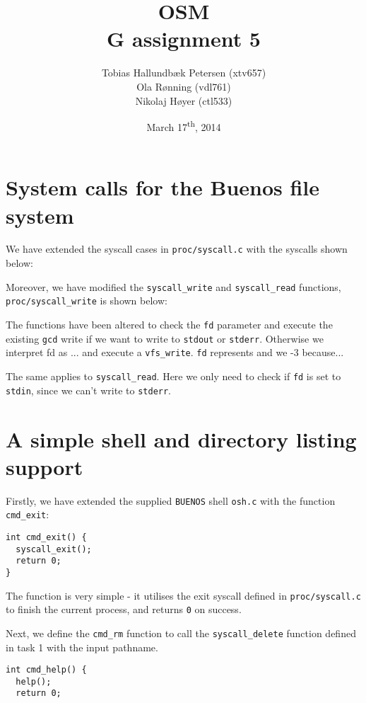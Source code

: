\documentclass[a4paper,12pt]{article}
\title{OSM\\G assignment 5}
\author{Tobias Hallundbæk Petersen (xtv657)\\Ola Rønning (vdl761)\\Nikolaj Høyer (ctl533)}
\date{March 17\textsuperscript{th}, 2014}
\begin{document}
\maketitle
\tableofcontents
\newpage

\section{System calls for the Buenos file system}
We have extended the syscall cases in \texttt{proc/syscall.c} with the syscalls shown below:


Moreover, we have modified the \texttt{syscall\_write} and \texttt{syscall\_read} functions, \texttt{proc/syscall\_write} is shown below:


The functions have been altered to check the \texttt{fd} parameter and execute the existing \texttt{gcd} write if we want to write to \texttt{stdout} or \texttt{stderr}. Otherwise we interpret fd as ... and execute a \texttt{vfs\_write}. \texttt{fd} represents and we -3 because...

The same applies to \texttt{syscall\_read}. Here we only need to check if \texttt{fd} is set to \texttt{stdin}, since we can't write to \texttt{stderr}.

\section{A simple shell and directory listing support}
Firstly, we have extended the supplied \texttt{BUENOS} shell \texttt{osh.c} with the function \texttt{cmd\_exit}:
\begin{lstlisting}
int cmd_exit() {
  syscall_exit();
  return 0;
}
\end{lstlisting}
The function is very simple - it utilises the exit syscall defined in \texttt{proc/syscall.c} to finish the current process, and returns \texttt{0} on success.

Next, we define the \texttt{cmd\_rm} function to call the \texttt{syscall\_delete} function defined in task 1 with the input pathname.
\begin{lstlisting}
int cmd_help() {
  help();
  return 0;
\end{lstlisting}
\end{document}
